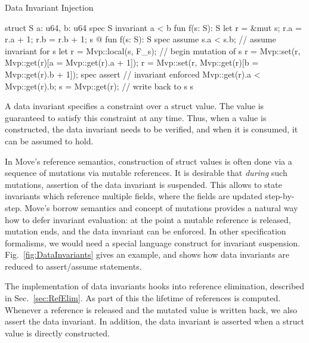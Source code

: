 \begin{Figure}
  \caption{Data Invariant Injection}
  \label{fig:DataInvariants}
  \centering
\begin{MoveBoxNumbered}
  struct S { a: u64, b: u64 }
  spec S { invariant a < b }
  fun f(s: S): S {
    let r = &mut s;
    r.a = r.a + 1;
    r.b = r.b + 1;
    s
  }
  @\transform@
  fun f(s: S): S {
    spec assume s.a < s.b;      // assume invariant for s
    let r = Mvp::local(s, F_s); // begin mutation of s
    r = Mvp::set(r, Mvp::get(r)[a = Mvp::get(r).a + 1]);
    r = Mvp::set(r, Mvp::get(r)[b = Mvp::get(r).b + 1]);
    spec assert                 // invariant enforced
      Mvp::get(r).a < Mvp::get(r).b;
    s = Mvp::get(r);            // write back to s
    s
  }
\end{MoveBoxNumbered}
\end{Figure}

A data invariant specifies a constraint over a struct value. The value is
guaranteed to satisfy this constraint at any time. Thus, when a value is
constructed, the data invariant needs to be verified, and when it is consumed,
it can be assumed to hold.

In Move's reference semantics, construction of struct values is often done via a
sequence of mutations via mutable references. It is desirable that \emph{during}
such mutations, assertion of the data invariant is suspended. This allows to
state invariants which reference multiple fields, where the fields are updated
step-by-step.  Move's borrow semantics and concept of mutations provides a
natural way how to defer invariant evaluation: at the point a mutable reference
is released, mutation ends, and the data invariant can be enforced.  In other
specification formalisms, we would need a special language construct for
invariant suspension. Fig.~\ref{fig:DataInvariants} gives an example, and shows
how data invariants are reduced to assert/assume statements.

The implementation of data invariants hooks into reference elimination,
described in Sec.~\ref{sec:RefElim}. As part of this the lifetime of references
is computed. Whenever a reference is released and the mutated value is written
back, we also assert the data invariant. In addition, the data invariant is
asserted when a struct value is directly constructed.


